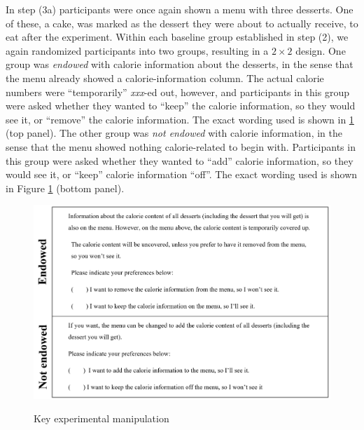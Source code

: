 \documentclass[12pt]{article}
\begin{document}

In step (3a) participants were once again shown a menu with three desserts. One of these, a cake, was marked as the dessert they were about to actually receive, to eat after the experiment. Within each baseline group established in step (2), we again randomized participants into two groups, resulting in a $2 \times 2$ design. One group was \emph{endowed} with calorie information about the desserts, in the sense that the menu already showed a calorie-information column. The actual calorie numbers were \enquote{temporarily} \emph{xxx}-ed out, however, and participants in this group were asked whether they wanted to \enquote{keep} the calorie information, so they would see it, or \enquote{remove} the calorie information. The exact wording used is shown in \ref{fig:expManipulation} (top panel). The other group was \emph{not endowed} with calorie information, in the sense that the menu showed nothing calorie-related to begin with. Participants in this group were asked whether they wanted to \enquote{add} calorie information, so they would see it, or \enquote{keep} calorie information \enquote{off}. The exact wording used is shown in Figure  \ref{fig:expManipulation} (bottom panel).

\begin{figure}[ht]
  \caption{Key experimental manipulation}\label{fig:expManipulation}
  \begin{center}
  {\includegraphics[width=1\textwidth]{./figures/keyManipulation.png}}
  \end{center}
\end{figure}
\end{document}
